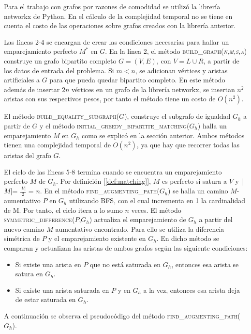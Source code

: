 \documentclass[10pt]{article} %
\begin{document}
	Para el trabajo con grafos por razones de comodidad se utiliz\'o la librer\'ia networkx de Python. En el c\'alculo de la complejidad temporal no se tiene en cuenta el costo de las operaciones sobre grafos creados con la librer\'ia anterior.
	
	Las l\'ineas 2-4 se encargan de crear las condiciones necesarias para hallar un emparejamiento perfecto $M^*$ en $G$. En la l\'inea 2, el m\'etodo \textsc{build\_graph(\textit{n,m,s,a})} construye un grafo bipartito completo $G = (V,E)$, con $V = L \cup R$, a partir de los datos de entrada del problema. Si $m<n$, se adicionan v\'ertices y aristas artificiales a $G$ para que pueda quedar bipartito completo. En este m\'etodo adem\'as de insertar $2n$ v\'ertices en un grafo de la librer\'ia networkx, se insertan $n^2$ aristas con sus respectivos pesos, por tanto el m\'etodo tiene un costo de $O(n^2)$. 
	
	El m\'etodo \textsc{build\_equality\_subgraph($G$}), construye el subgrafo de igualdad $G_h$ a partir de $G$ y el m\'etodo \textsc{ initial\_greedy\_bipartite\_matching($G_h$)} halla un emparejamiento $M$ en $G_h$ como se explic\'o en la secci\'on anterior. Ambos m\'etodos tienen una complejidad temporal de $O(n^2)$, ya que hay que recorrer todas las aristas del grafo $G$.
	
	El ciclo de las l\'ineas 5-8 termina cuando se encuentra un emparejamiento perfecto $M$ de $G_h$. Por definici\'on [\ref{def:matching}], $M$ es perfecto si satura a $V$ y |$M$|= $\frac{|V|}{2}$ = $n$. En el m\'etodo \textsc{find\_augmenting\_path($G_h$)} se halla un camino $M$-aumentativo $P$ en $G_h$ utilizando BFS, con el cual incrementa en 1 la cardinalidad de M. Por tanto, el ciclo itera a lo sumo $n$ veces. El m\'etodo \textsc{symmetric\_difference($P$,$G_h$)} actualiza el emparejamiento de $G_h$ a partir del nuevo camino $M$-aumentativo encontrado. Para ello se utiliza la diferencia sim\'etrica de $P$ y el emparejamiento existente en $G_h$. En dicho m\'etodo se comparan y actualizan las aristas de ambos grafos seg\'un las siguiente condiciones:
	\begin{itemize}
		\item  Si existe una arista en $P$ que no est\'a saturada en $G_h$, entonces esa arista se satura en $G_h$.
		\item Si existe una arista saturada en $P$ y en $G_h$ a la vez, entonces esa arista deja de estar saturada en $G_h$.
	\end{itemize}
	
	A continuaci\'on se observa el pseudoc\'odigo del m\'etodo \textsc{find\_augmenting\_path($G_h$)}. 
	
\end{document}
